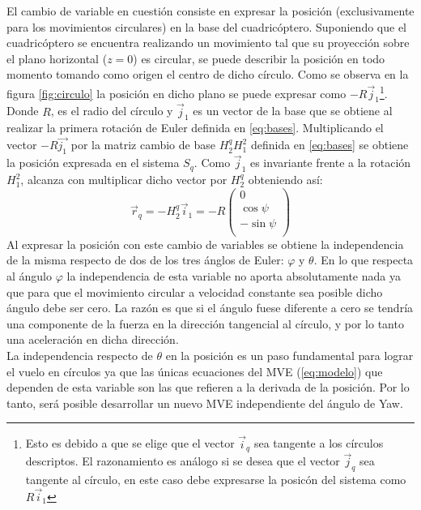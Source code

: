 \documentclass[main]{subfiles}
\begin{document}
El cambio de variable en cuesti\'on consiste en expresar la posici\'on (exclusivamente para los movimientos circulares) en la base del cuadric\'optero. Suponiendo que el cuadric\'optero se encuentra realizando un movimiento tal que su proyecci\'on sobre el plano horizontal ($z=0$) es circular, se puede describir la posici\'on en todo momento tomando como origen el centro de dicho c\'irculo. Como se observa en la figura \ref{fig:circulo} la posici\'on en dicho plano se puede expresar como $-R\vec{j}_1$\footnote{Esto es debido a que se elige que el vector $\vec{i}_q$ sea tangente a los c\'irculos descriptos. El razonamiento es an\'alogo si se desea que el vector $\vec{j}_q$ sea tangente al c\'irculo, en este caso debe expresarse la posic\'on del sistema como $R\vec{i}_1$}. Donde $R$, es el radio del c\'irculo y $\vec{j}_1$ es un vector de la base que se obtiene al realizar la primera rotaci\'on de Euler definida en \ref{eq:bases}. Multiplicando el vector $-R\vec{j_1}$ por la matriz cambio de base $H_2^qH_1^2$ definida en \ref{eq:bases} se obtiene la posici\'on expresada en el sistema $S_q$. Como $\vec{j}_1$ es invariante frente a la rotaci\'on $H_1^2$, alcanza con multiplicar dicho vector por $H_2^q$ obteniendo as\'i:
\begin{equation}
\label{eq:pos_circ}
\vec{r}_q=-H_2^q\vec{i}_1=-R\left(\begin{array}{c}
0\\
\cos\psi\\
-\sin\psi\\
\end{array}\right)
\end{equation}
Al expresar la posici\'on con este cambio de variables se obtiene la independencia de la misma respecto de dos de los tres \'anglos de Euler: $\varphi$ y $\theta$. En lo que respecta al \'angulo $\varphi$ la independencia de esta variable no aporta absolutamente nada ya que para que el movimiento circular a velocidad constante sea posible dicho \'angulo debe ser cero. La raz\'on es que si el \'angulo fuese diferente a cero se tendr\'ia una componente de la fuerza en la direcci\'on tangencial al c\'irculo, y por lo tanto una aceleraci\'on en dicha direcci\'on.\\

La independencia respecto de $\theta$ en la posici\'on es un paso fundamental para lograr el vuelo en c\'irculos ya que las \'unicas ecuaciones del MVE (\ref{eq:modelo}) que dependen de esta variable son las que refieren a la derivada de la posici\'on. Por lo tanto, ser\'a posible desarrollar un nuevo MVE independiente del \'angulo de Yaw.\\
\end{document}
